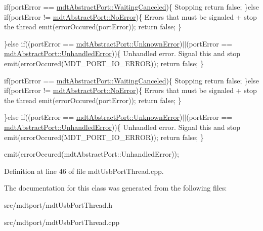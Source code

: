 if(portError == \hyperlink{classmdt_abstract_port_ad4121bb930c95887e77f8bafa065a85ea14c0ddb478968710cb057a70406e4888}{mdtAbstractPort::WaitingCanceled})\{ Stopping return false; \}else if(portError != \hyperlink{classmdt_abstract_port_ad4121bb930c95887e77f8bafa065a85eab898bd273effe5cb4ed1a399a2d4baad}{mdtAbstractPort::NoError})\{ Errors that must be signaled + stop the thread emit(errorOccured(portError)); return false; \}

\}else if((portError == \hyperlink{classmdt_abstract_port_ad4121bb930c95887e77f8bafa065a85eacb8cc31d0b00dda9e25ed1cc1fa17871}{mdtAbstractPort::UnknownError})$|$$|$(portError == \hyperlink{classmdt_abstract_port_ad4121bb930c95887e77f8bafa065a85ea6e24e272af4da51c84eef5825c5cd712}{mdtAbstractPort::UnhandledError}))\{ Unhandled error. Signal this and stop emit(errorOccured(MDT\_\-PORT\_\-IO\_\-ERROR)); return false; \}

if(portError == \hyperlink{classmdt_abstract_port_ad4121bb930c95887e77f8bafa065a85ea14c0ddb478968710cb057a70406e4888}{mdtAbstractPort::WaitingCanceled})\{ Stopping return false; \}else if(portError != \hyperlink{classmdt_abstract_port_ad4121bb930c95887e77f8bafa065a85eab898bd273effe5cb4ed1a399a2d4baad}{mdtAbstractPort::NoError})\{ Errors that must be signaled + stop the thread emit(errorOccured(portError)); return false; \}

\}else if((portError == \hyperlink{classmdt_abstract_port_ad4121bb930c95887e77f8bafa065a85eacb8cc31d0b00dda9e25ed1cc1fa17871}{mdtAbstractPort::UnknownError})$|$$|$(portError == \hyperlink{classmdt_abstract_port_ad4121bb930c95887e77f8bafa065a85ea6e24e272af4da51c84eef5825c5cd712}{mdtAbstractPort::UnhandledError}))\{ Unhandled error. Signal this and stop emit(errorOccured(MDT\_\-PORT\_\-IO\_\-ERROR)); return false; \}

emit(errorOccured(mdtAbstractPort::UnhandledError)); 



Definition at line 46 of file mdtUsbPortThread.cpp.



The documentation for this class was generated from the following files:\begin{DoxyCompactItemize}
\item 
src/mdtport/mdtUsbPortThread.h\item 
src/mdtport/mdtUsbPortThread.cpp\end{DoxyCompactItemize}
